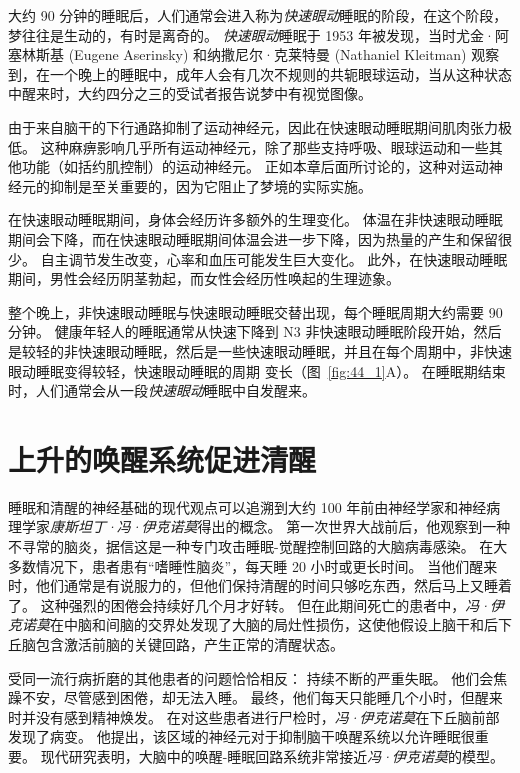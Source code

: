 大约 90 分钟的睡眠后，人们通常会进入称为\textit{快速眼动}睡眠的阶段，在这个阶段，梦往往是生动的，有时是离奇的。
\textit{快速眼动}睡眠于 1953 年被发现，当时尤金·阿塞林斯基 (Eugene Aserinsky) 和纳撒尼尔·克莱特曼 (Nathaniel Kleitman) 观察到，在一个晚上的睡眠中，成年人会有几次不规则的共轭眼球运动，当从这种状态中醒来时，大约四分之三的受试者报告说梦中有视觉图像。


由于来自脑干的下行通路抑制了运动神经元，因此在快速眼动睡眠期间肌肉张力极低。
这种麻痹影响几乎所有运动神经元，除了那些支持呼吸、眼球运动和一些其他功能（如括约肌控制）的运动神经元。
正如本章后面所讨论的，这种对运动神经元的抑制是至关重要的，因为它阻止了梦境的实际实施。


在快速眼动睡眠期间，身体会经历许多额外的生理变化。
体温在非快速眼动睡眠期间会下降，而在快速眼动睡眠期间体温会进一步下降，因为热量的产生和保留很少。
自主调节发生改变，心率和血压可能发生巨大变化。
此外，在快速眼动睡眠期间，男性会经历阴茎勃起，而女性会经历性唤起的生理迹象。


整个晚上，非快速眼动睡眠与快速眼动睡眠交替出现，每个睡眠周期大约需要 90 分钟。
健康年轻人的睡眠通常从快速下降到 N3 非快速眼动睡眠阶段开始，然后是较轻的非快速眼动睡眠，然后是一些快速眼动睡眠，并且在每个周期中，非快速眼动睡眠变得较轻，快速眼动睡眠的周期 变长（图~\ref{fig:44_1}A）。
在睡眠期结束时，人们通常会从一段\textit{快速眼动}睡眠中自发醒来。



\section{上升的唤醒系统促进清醒}

睡眠和清醒的神经基础的现代观点可以追溯到大约 100 年前由神经学家和神经病理学家\textit{康斯坦丁·冯·伊克诺莫}得出的概念。
第一次世界大战前后，他观察到一种不寻常的脑炎，据信这是一种专门攻击睡眠-觉醒控制回路的大脑病毒感染。
在大多数情况下，患者患有“嗜睡性脑炎”，每天睡 20 小时或更长时间。
当他们醒来时，他们通常是有说服力的，但他们保持清醒的时间只够吃东西，然后马上又睡着了。
这种强烈的困倦会持续好几个月才好转。
但在此期间死亡的患者中，\textit{冯·伊克诺莫}在中脑和间脑的交界处发现了大脑的局灶性损伤，这使他假设上脑干和后下丘脑包含激活前脑的关键回路，产生正常的清醒状态。


受同一流行病折磨的其他患者的问题恰恰相反：
持续不断的严重失眠。
他们会焦躁不安，尽管感到困倦，却无法入睡。
最终，他们每天只能睡几个小时，但醒来时并没有感到精神焕发。
在对这些患者进行尸检时，\textit{冯·伊克诺莫}在下丘脑前部发现了病变。
他提出，该区域的神经元对于抑制脑干唤醒系统以允许睡眠很重要。
现代研究表明，大脑中的唤醒-睡眠回路系统非常接近\textit{冯·伊克诺莫}的模型。



